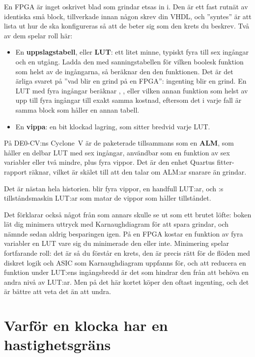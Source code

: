 En FPGA är inget oskrivet blad som grindar etsas in i. Den är ett fast rutnät av identiska små
block, tillverkade innan någon skrev din VHDL, och ”syntes” är att lista ut hur de ska konfigureras
så att de beter sig som den krets du beskrev. Två av dem spelar roll här:
\begin{itemize}
  \item En \textbf{uppslagstabell}, eller \textbf{LUT}: ett litet minne, typiskt fyra till sex
    ingångar och en utgång. Ladda den med sanningstabellen för vilken boolesk funktion som helst av
    de ingångarna, så beräknar den den funktionen. Det är det ärliga svaret på ”vad blir en grind
    på en FPGA”: ingenting blir en grind. En LUT med fyra ingångar beräknar ,
    , eller vilken annan funktion som helst av upp till fyra
    ingångar till exakt samma kostnad, eftersom det i varje fall är samma block som håller en annan
    tabell.
  \item En \textbf{vippa}: en bit klockad lagring, som sitter bredvid varje LUT.
\end{itemize}

På DE0-CV:ns Cyclone~V är de paketerade tillsammans som en \textbf{ALM}, som håller en delbar LUT
med sex ingångar, användbar som en funktion av sex variabler eller två mindre, plus fyra vippor.
Det är den enhet Quartus fitter-rapport räknar, vilket är skälet till att den talar om ALM:ar
snarare än grindar.

Det är nästan hela historien.  blir fyra vippor,  en handfull
LUT:ar, och :s tillståndsmaskin LUT:ar som matar de vippor som håller tillståndet.

Det förklarar också något från  som annars skulle se ut som ett brutet löfte: boken
lät dig minimera uttryck med Karnaughdiagram för att spara grindar, och nämnde sedan aldrig
besparingen igen. På en FPGA kostar en funktion av fyra variabler en LUT vare sig du minimerade den
eller inte. Minimering spelar fortfarande roll: det är så du förstår en krets, den är precis rätt
för de flöden med diskret logik och ASIC som Karnaughdiagram uppfanns för, och att reducera en
funktion under LUT:ens ingångsbredd är det som hindrar den från att behöva en andra nivå av LUT:ar.
Men på det här kortet köper den oftast ingenting, och det är bättre att veta det än att undra.

\section{Varför en klocka har en hastighetsgräns}
\label{c5:sec:fmax}

